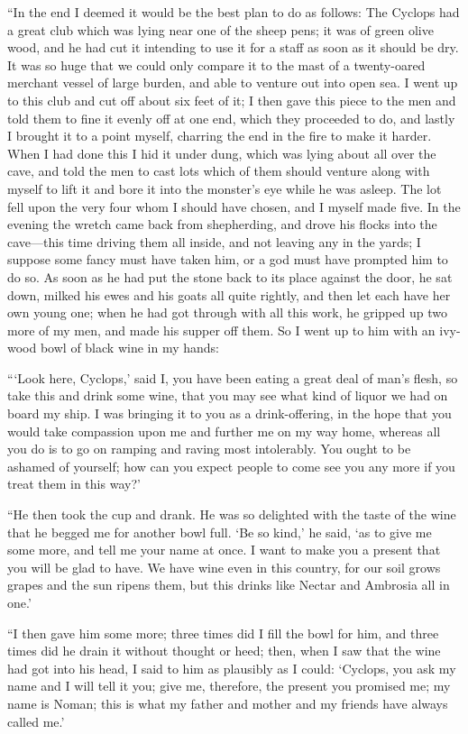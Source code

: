 “In the end I deemed it would be the best plan to do as follows: The Cyclops
had a great club which was lying near one of the sheep pens; it was of green
olive wood, and he had cut it intending to use it for a staff as soon as it
should be dry. It was so huge that we could only compare it to the mast of a
twenty-oared merchant vessel of large burden, and able to venture out into open
sea. I went up to this club and cut off about six feet of it; I then gave this
piece to the men and told them to fine it evenly off at one end, which they
proceeded to do, and lastly I brought it to a point myself, charring the end in
the fire to make it harder. When I had done this I hid it under dung, which was
lying about all over the cave, and told the men to cast lots which of them
should venture along with myself to lift it and bore it into the monster’s eye
while he was asleep. The lot fell upon the very four whom I should have chosen,
and I myself made five. In the evening the wretch came back from shepherding,
and drove his flocks into the cave—this time driving them all inside, and not
leaving any in the yards; I suppose some fancy must have taken him, or a god
must have prompted him to do so. As soon as he had put the stone back to its
place against the door, he sat down, milked his ewes and his goats all quite
rightly, and then let each have her own young one; when he had got through with
all this work, he gripped up two more of my men, and made his supper off them.
So I went up to him with an ivy-wood bowl of black wine in my hands:

“‘Look here, Cyclops,’ said I, you have been eating a great deal of man’s
flesh, so take this and drink some wine, that you may see what kind of liquor
we had on board my ship. I was bringing it to you as a drink-offering, in the
hope that you would take compassion upon me and further me on my way home,
whereas all you do is to go on ramping and raving most intolerably. You ought
to be ashamed of yourself; how can you expect people to come see you any more
if you treat them in this way?’

“He then took the cup and drank. He was so delighted with the taste of the wine
that he begged me for another bowl full. ‘Be so kind,’ he said, ‘as to give me
some more, and tell me your name at once. I want to make you a present that you
will be glad to have. We have wine even in this country, for our soil grows
grapes and the sun ripens them, but this drinks like Nectar and Ambrosia all in
one.’

“I then gave him some more; three times did I fill the bowl for him, and three
times did he drain it without thought or heed; then, when I saw that the wine
had got into his head, I said to him as plausibly as I could: ‘Cyclops, you ask
my name and I will tell it you; give me, therefore, the present you promised
me; my name is Noman; this is what my father and mother and my friends have
always called me.’

